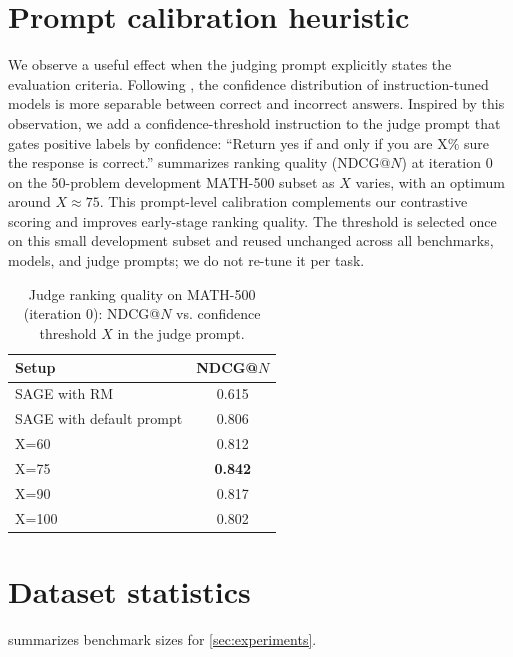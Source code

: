 \documentclass[letterpaper]{article} %
\begin{document}
\section{Prompt calibration heuristic}
\label{sec:app-prompt-calibration}
\noindent We observe a useful effect when the judging prompt explicitly states the evaluation criteria. Following \citet{kalai2025language}, the confidence distribution of instruction-tuned models is more separable between correct and incorrect answers. Inspired by this observation, we add a confidence-threshold instruction to the judge prompt that gates positive labels by confidence: ``Return yes if and only if you are X\% sure the response is correct.''  summarizes ranking quality (NDCG@\(N\)) at iteration 0 on the \textcolor{orange!85!black}{50-problem development} MATH-500 subset as \(X\) varies, with an optimum around \(X\!\approx\!75\). This prompt-level calibration complements our contrastive scoring and improves early-stage ranking quality. \textcolor{orange!85!black}{The threshold is selected once on this small development subset and reused unchanged across all benchmarks, models, and judge prompts; we do not re-tune it per task.}
\begin{table}[htbp]
\centering
\begin{small}
\begin{sc}
\begin{tabular}{lc}
\toprule
\textbf{Setup} & \textbf{NDCG@$N$} \\
\midrule
SAGE with RM & 0.615 \\
SAGE with default prompt & 0.806 \\
X=60 & 0.812 \\
X=75 & \textbf{0.842} \\
X=90 & 0.817 \\
X=100 & 0.802 \\
\bottomrule
\end{tabular}
\end{sc}
\end{small}
\caption{Judge ranking quality on MATH-500 (iteration 0): NDCG@\(N\) vs. confidence threshold \(X\) in the judge prompt.}
\label{tab:judge-threshold-ndcg}
\end{table}

\section{Dataset statistics}
 summarizes benchmark sizes for \cref{sec:experiments}.
\end{document}
